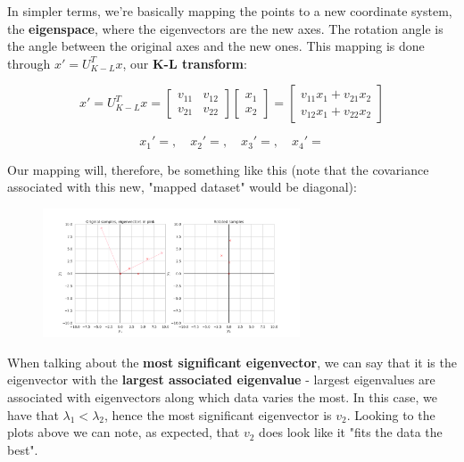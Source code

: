 \documentclass[12pt]{article}
\begin{document}
\begin{enumerate}[leftmargin=\labelsep]
  In simpler terms, we're basically mapping the points to a new coordinate system,
  the \textbf{eigenspace}, where the eigenvectors are the new axes. The rotation
  angle is the angle between the original axes and the new ones. This mapping is done
  through $x' = U_{K-L}^T x$, our \textbf{K-L transform}:

  \begin{equation*}
    x' = U_{K-L}^T x
    = \begin{bmatrix}
      v_{11} & v_{12} \\
      v_{21} & v_{22}
    \end{bmatrix}
    \begin{bmatrix}
      x_1 \\
      x_2
    \end{bmatrix}
    = \begin{bmatrix}
      v_{11} x_1 + v_{21} x_2 \\
      v_{12} x_1 + v_{22} x_2
    \end{bmatrix}
  \end{equation*}

  \begin{equation*}
    x_1' = , \quad x_2' = ,
    \quad x_3' = , \quad x_4' = 
  \end{equation*}

  Our mapping will, therefore, be something like this (note that
  the covariance associated with this new, "mapped dataset" would be diagonal):

  \begin{figure}[h]
    \centering
    \includegraphics[width=0.68\textwidth]{assets/ex-1/kl-transform.png}
    \label{fig:kl-transform}
  \end{figure}

  When talking about the \textbf{most significant eigenvector}, we can say that it is the
  eigenvector with the \textbf{largest associated eigenvalue} - largest eigenvalues
  are associated with eigenvectors along which data varies the most. In this case, we have that $\lambda_1 < \lambda_2$,
  hence the most significant eigenvector is $v_2$. Looking to the plots above we
  can note, as expected, that $v_2$ does look like it "fits the data the best".


\end{enumerate}
\end{document}
